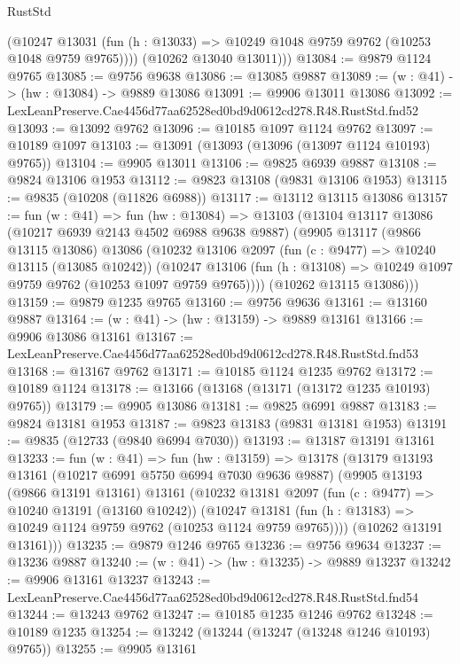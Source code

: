 \begin{lexlean}{RustStd}
\begin{coremodule}
          (@10247 @13031 (fun (h : @13033) => @10249 @1048 @9759 @9762 (@10253 @1048 @9759 @9765))))
        (@10262 @13040 @13011)))
@13084 := @9879 @1124 @9765
@13085 := @9756 @9638
@13086 := @13085 @9887
@13089 := (w : @41) -> (hw : @13084) -> @9889 @13086
@13091 := @9906 @13011 @13086
@13092 := LexLeanPreserve.Cae4456d77aa62528ed0bd9d0612cd278.R48.RustStd.fnd52
@13093 := @13092 @9762
@13096 := @10185 @1097 @1124 @9762
@13097 := @10189 @1097
@13103 := @13091 (@13093 (@13096 (@13097 @1124 @10193) @9765))
@13104 := @9905 @13011
@13106 := @9825 @6939 @9887
@13108 := @9824 @13106 @1953
@13112 := @9823 @13108 (@9831 @13106 @1953)
@13115 := @9835 (@10208 (@11826 @6988))
@13117 := @13112 @13115 @13086
@13157 := fun (w : @41) =>
  fun (hw : @13084) =>
  @13103
    (@13104
      @13117
      @13086
      (@10217 @6939 @2143 @4502 @6988 @9638 @9887)
      (@9905
        @13117
        (@9866 @13115 @13086)
        @13086
        (@10232
          @13106
          @2097
          (fun (c : @9477) => @10240 @13115 (@13085 @10242))
          (@10247 @13106 (fun (h : @13108) => @10249 @1097 @9759 @9762 (@10253 @1097 @9759 @9765))))
        (@10262 @13115 @13086)))
@13159 := @9879 @1235 @9765
@13160 := @9756 @9636
@13161 := @13160 @9887
@13164 := (w : @41) -> (hw : @13159) -> @9889 @13161
@13166 := @9906 @13086 @13161
@13167 := LexLeanPreserve.Cae4456d77aa62528ed0bd9d0612cd278.R48.RustStd.fnd53
@13168 := @13167 @9762
@13171 := @10185 @1124 @1235 @9762
@13172 := @10189 @1124
@13178 := @13166 (@13168 (@13171 (@13172 @1235 @10193) @9765))
@13179 := @9905 @13086
@13181 := @9825 @6991 @9887
@13183 := @9824 @13181 @1953
@13187 := @9823 @13183 (@9831 @13181 @1953)
@13191 := @9835 (@12733 (@9840 @6994 @7030))
@13193 := @13187 @13191 @13161
@13233 := fun (w : @41) =>
  fun (hw : @13159) =>
  @13178
    (@13179
      @13193
      @13161
      (@10217 @6991 @5750 @6994 @7030 @9636 @9887)
      (@9905
        @13193
        (@9866 @13191 @13161)
        @13161
        (@10232
          @13181
          @2097
          (fun (c : @9477) => @10240 @13191 (@13160 @10242))
          (@10247 @13181 (fun (h : @13183) => @10249 @1124 @9759 @9762 (@10253 @1124 @9759 @9765))))
        (@10262 @13191 @13161)))
@13235 := @9879 @1246 @9765
@13236 := @9756 @9634
@13237 := @13236 @9887
@13240 := (w : @41) -> (hw : @13235) -> @9889 @13237
@13242 := @9906 @13161 @13237
@13243 := LexLeanPreserve.Cae4456d77aa62528ed0bd9d0612cd278.R48.RustStd.fnd54
@13244 := @13243 @9762
@13247 := @10185 @1235 @1246 @9762
@13248 := @10189 @1235
@13254 := @13242 (@13244 (@13247 (@13248 @1246 @10193) @9765))
@13255 := @9905 @13161

\end{coremodule}
\end{lexlean}
